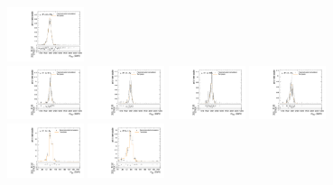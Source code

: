\begin{figure}[htpb]
  \includegraphics[width=0.2\textwidth]{fig/analysisAppendix/templateVsReco_RadToWW2000_r0_MVV_mu_LP_nobb_HDy_linear.pdf}\\
  \includegraphics[width=0.2\textwidth]{fig/analysisAppendix/templateVsReco_RadToWW2000_r0_MVV_mu_HP_vbf_LDy_linear.pdf}
  \includegraphics[width=0.2\textwidth]{fig/analysisAppendix/templateVsReco_RadToWW2000_r0_MVV_mu_LP_vbf_LDy_linear.pdf}
  \includegraphics[width=0.2\textwidth]{fig/analysisAppendix/templateVsReco_RadToWW2000_r0_MVV_mu_HP_vbf_HDy_linear.pdf}
  \includegraphics[width=0.2\textwidth]{fig/analysisAppendix/templateVsReco_RadToWW2000_r0_MVV_mu_LP_vbf_HDy_linear.pdf}\\
  \includegraphics[width=0.2\textwidth]{fig/analysisAppendix/templateVsReco_RadToWW2000_r0_MJ_mu_HP_bb_LDy.pdf}
  \includegraphics[width=0.2\textwidth]{fig/analysisAppendix/templateVsReco_RadToWW2000_r0_MJ_mu_LP_bb_LDy.pdf}

\end{figure}
